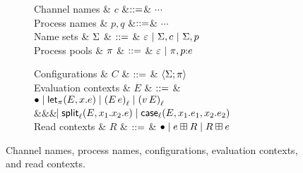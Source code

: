 \begin{figure*}[t]
\centering
\begin{subfigure}{0.35\textwidth}
\begin{grammar}
  Channel names & $c$   &$\bnfas$& $\cdots$
  \\
  Process names & $p,q$ &$\bnfas$& $\cdots$
  \\
  Name sets
  & $\Names$ 
    & $\bnfas$ & $\emptyNames ~|~ \Names, c ~|~ \Names, p$
  \\
  Process pools
  & $\Procs$ 
    & $\bnfas$ & $\emptyProcs ~|~ \Procs, p{:}\proc{e}$
\end{grammar}
\end{subfigure}%
\begin{subfigure}{0.5\textwidth}
  \begin{grammar}
  Configurations
  & $C$
     & $\bnfas$ & $\Config{\Names}{}{\Procs} $
     \\
 Evaluation contexts
  & $E$
     & $\bnfas$ & 
 $\bullet \bnfalt \eLet{x}{E}{e} \bnfalt \eApp{E}{e}{\ell} \bnfalt \eApp{v}{E}{\ell}$
\\ &&& $\bnfaltbrk \eSplitt{\ell}{E}{x_1}{x_2}{e} \bnfalt \eCase{\ell}{E}{x_1}{e_1}{x_2}{e_2}$
\\
 Read contexts
  & $R$
     & $\bnfas$ & $\bullet \bnfalt e \boxplus R \bnfalt R \boxplus e$
\end{grammar}
\end{subfigure}
\caption{Channel names, process names, configurations, evaluation contexts, and
  read contexts.}
\label{fig:configs}
\end{figure*}

